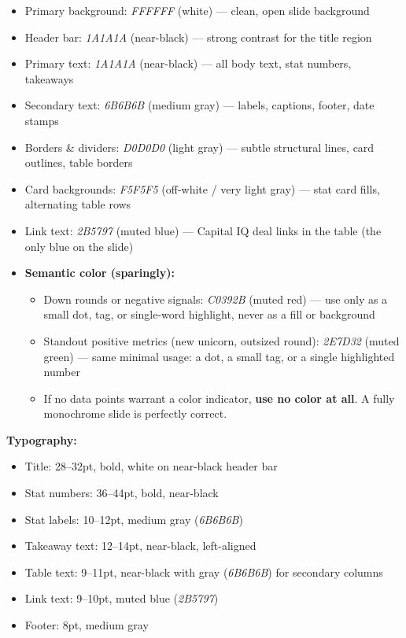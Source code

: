 \documentclass[11pt]{article}
\begin{document}
\begin{itemize}[leftmargin=*,itemsep=2pt,topsep=2pt]
\item {} Primary background: \emph{FFFFFF} (white) — clean, open slide background
\item {} Header bar: \emph{1A1A1A} (near-black) — strong contrast for the title region
\item {} Primary text: \emph{1A1A1A} (near-black) — all body text, stat numbers, takeaways
\item {} Secondary text: \emph{6B6B6B} (medium gray) — labels, captions, footer, date stamps
\item {} Borders \& dividers: \emph{D0D0D0} (light gray) — subtle structural lines, card outlines, table borders
\item {} Card backgrounds: \emph{F5F5F5} (off-white / very light gray) — stat card fills, alternating table rows
\item {} Link text: \emph{2B5797} (muted blue) — Capital IQ deal links in the table (the only blue on the slide)
\item {} \textbf{Semantic color (sparingly):}
\begin{itemize}[leftmargin=*,itemsep=2pt,topsep=2pt]
\item {} Down rounds or negative signals: \emph{C0392B} (muted red) — use only as a small dot, tag, or single-word highlight, never as a fill or background
\item {} Standout positive metrics (new unicorn, outsized round): \emph{2E7D32} (muted green) — same minimal usage: a dot, a small tag, or a single highlighted number
\item {} If no data points warrant a color indicator, \textbf{use no color at all}. A fully monochrome slide is perfectly correct.
\end{itemize}
\end{itemize}

\textbf{Typography:}

\begin{itemize}[leftmargin=*,itemsep=2pt,topsep=2pt]
\item {} Title: 28–32pt, bold, white on near-black header bar
\item {} Stat numbers: 36–44pt, bold, near-black
\item {} Stat labels: 10–12pt, medium gray (\emph{6B6B6B})
\item {} Takeaway text: 12–14pt, near-black, left-aligned
\item {} Table text: 9–11pt, near-black with gray (\emph{6B6B6B}) for secondary columns
\item {} Link text: 9–10pt, muted blue (\emph{2B5797})
\item {} Footer: 8pt, medium gray
\end{itemize}
\end{document}
